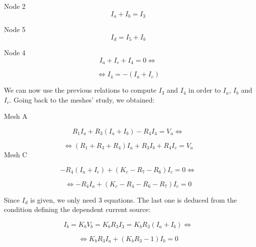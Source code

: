 Node 2
\begin{equation}
	I_a + I_b = I_3
	\label{eq:nod1}
\end{equation}

Node 5
\begin{equation}
	I_d = I_5 + I_b 
	\label{eq:nod2}
\end{equation}

Node 4
\begin{equation}
	I_a + I_c + I_4 = 0 \Leftrightarrow 
	\label{eq:nod3}
\end{equation}

\begin{equation}
    \Leftrightarrow I_4 = -(I_a + I_c)
	\label{eq:nod3}
\end{equation}

We can now use the previous relations to compute $I_3$ and $I_4$ in order to $I_a$, $I_b$ and $I_c$. Going back to the meshes' study, we obtained: 
\par
Mesh A

\begin{equation}
	R_1I_a + R_3(I_a + I_b) - R_4I_4 = V_a\Leftrightarrow
	\label{eq:vo_sol}
\end{equation}

\begin{equation}
	\Leftrightarrow (R_1 + R_3 + R_4)I_a + R_3I_b + R_4I_c = V_a
	\label{eq:vo_sol}
\end{equation}
Mesh C

\begin{equation}
	-R_4(I_a + I_c) + (K_c - R_7 - R_6)I_c = 0\Leftrightarrow 
	\label{eq:vo_sol1}
\end{equation}

\begin{equation}
	\Leftrightarrow -R_4I_a + (K_c - R_4 - R_6 - R_7)I_c = 0
	\label{eq:vo_sol1}
\end{equation}

Since $I_d$ is given, we only need 3 equations. The last one is deduced from the condition defining the dependent current source:

\begin{equation}
	I_b = K_bV_b = K_bR_3I_3 = K_bR_3(I_a + I_b)\Leftrightarrow
	\label{eq:vo_nat}
\end{equation}

\begin{equation}
	\Leftrightarrow K_bR_3I_a + (K_bR_3 - 1)I_b = 0
	\label{eq:vo_nat}
\end{equation}


